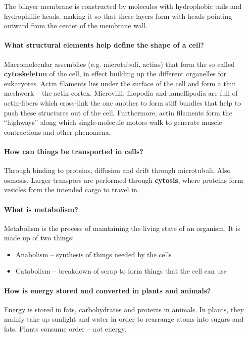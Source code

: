 \documentclass[a4paper,12pt]{article}
\begin{document}
         The bilayer membrane is constructed by molecules with hydrophobic tails
         and hydrophillic heads, making it so that these layers form with heads
         pointing outward from the center of the membrane wall. 
         
      \paragraph{What structural elements help define the shape of a cell?\\}
         Macromolecular assemblies (e.g. microtubuli, actins) that form the so
         called \textbf{cytoskeleton} of the cell, in effect building up the
         different organelles for eukaryotes. Actin filaments lies under the
         surface of the cell and form a thin meshwork -- the actin cortex.
         Microvilli, filopodia and lamellipodia are full of actin-fibers which
         cross-link the one another to form stiff bundles that help to push
         these structures out of the cell. Furthermore, actin filaments form the
         ``highways'' along which single-molecule motors walk to generate muscle
         contractions and other phenomena.


      \paragraph{How can things be transported in cells?\\}
         Through binding to proteins, diffusion and drift through microtubuli.
         Also osmosis. Larger transpors are performed through \textbf{cytosis},
         where proteins form vesicles form the intended cargo to travel in.

      \paragraph{What is metabolism?\\}
         Metabolism is the process of maintaining the living state of an
         organism. It is made up of two things: 
         \begin{itemize}
            \item Anabolism -- synthesis of things needed by the cells
            \item Catabolism -- breakdown of scrap to form things that the cell
               can use
         \end{itemize}
      
      \paragraph{How is energy stored and converted in plants and animals?\\}
         Energy is stored in fats, carbohydrates and proteins in animals. In
         plants, they mainly take up sunlight and water in order to rearrange
         atoms into sugars and fats. Plants consume order -- not energy. 
      
\end{document}
